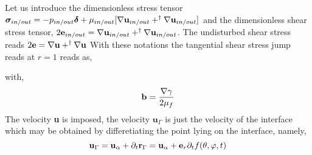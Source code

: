 Let us introduce the dimensionless stress tensor $\bm\sigma_{in/out} = -p_{in/out} \bm\delta + \mu_{in/out}[\mathbf{\nabla} \textbf{u}_{in/out} + ^\dagger \mathbf{\nabla} \textbf{u}_{in/out}]$ and the dimensionless shear stress tensor, $2\textbf{e}_{in/out} = \mathbf{\nabla} \textbf{u}_{in/out} + ^\dagger \mathbf{\nabla} \textbf{u}_{in/out}$. 
The undisturbed shear stress reads  $2\textbf{e} = \mathbf{\nabla} \textbf{u} + ^\dagger \mathbf{\nabla} \textbf{u}$
With these notations the tangential shear stress jump reads at $r = 1$ reads as, 

with, 
\begin{equation}
    \textbf{b}
    =
    \frac{\mathbf{\nabla} \gamma}{2\mu_f}
\end{equation}
The velocity \textbf{u} is imposed, the velocity $\textbf{u}_\Gamma$ is just the velocity of the interface which may be obtained by differetiating the point lying on the interface, namely, 
\begin{equation}
    \textbf{u}_\Gamma
    =
    \textbf{u}_\alpha
    +
    \partial_t \textbf{r}_\Gamma
    =
    \textbf{u}_\alpha
    + 
    \textbf{e}_r\partial_t f(\theta,\varphi,t)
\end{equation}
